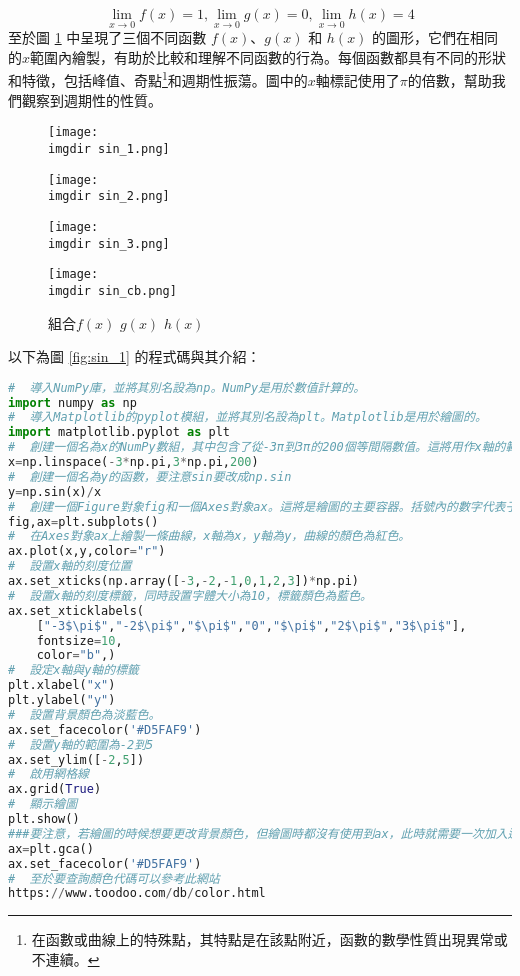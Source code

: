 $$\lim_{x \rightarrow 0}f(x)=1,\lim_{x \rightarrow 0}g(x)=0,\lim_{x \rightarrow 0}h(x)=4$$
至於圖 \ref{fig:sin_combine} 中呈現了三個不同函數 $f(x)$、$g(x)$ 和 $h(x)$ 的圖形，它們在相同的$x$範圍內繪製，有助於比較和理解不同函數的行為。每個函數都具有不同的形狀和特徵，包括峰值、奇點\footnote{在函數或曲線上的特殊點，其特點是在該點附近，函數的數學性質出現異常或不連續。}和週期性振蕩。圖中的$x$軸標記使用了$\pi$的倍數，幫助我們觀察到週期性的性質。
\begin{figure}[htbp]
\centering
\begin{minipage}{0.49\linewidth}
\centering
\texttt{[image: \\imgdir sin\_1.png]}
\caption{$f(x)=\frac{sin(x)}{x}$}
\label{fig:sin_1}
\end{minipage}
\begin{minipage}{0.49\linewidth}
\centering
\texttt{[image: \\imgdir sin\_2.png]}
\caption{$g(x)=\frac{sin(x^2)}{x}$}
\label{fig:sin_2}
\end{minipage}
\qquad
\begin{minipage}{0.49\linewidth}
\centering
\texttt{[image: \\imgdir sin\_3.png]}
\caption{$h(x)=\frac{sin^2(2x)}{x^2}$}
\label{fig:sin_3}
\end{minipage}
\begin{minipage}{0.49\linewidth}
\centering
\texttt{[image: \\imgdir sin\_cb.png]}
\caption{組合$f(x)$ $g(x)$ $h(x)$}
\label{fig:sin_combine}
\end{minipage}
\end{figure}
\newpage
以下為圖 \ref{fig:sin_1} 的程式碼與其介紹：
\begin{lstlisting}[language=Python]
#  導入NumPy庫，並將其別名設為np。NumPy是用於數值計算的。
import numpy as np
#  導入Matplotlib的pyplot模組，並將其別名設為plt。Matplotlib是用於繪圖的。
import matplotlib.pyplot as plt
#  創建一個名為x的NumPy數組，其中包含了從-3π到3π的200個等間隔數值。這將用作x軸的範圍。
x=np.linspace(-3*np.pi,3*np.pi,200)
#  創建一個名為y的函數，要注意sin要改成np.sin
y=np.sin(x)/x  
#  創建一個Figure對象fig和一個Axes對象ax。這將是繪圖的主要容器。括號內的數字代表子圖數量
fig,ax=plt.subplots()
#  在Axes對象ax上繪製一條曲線，x軸為x，y軸為y，曲線的顏色為紅色。
ax.plot(x,y,color="r")
#  設置x軸的刻度位置
ax.set_xticks(np.array([-3,-2,-1,0,1,2,3])*np.pi)
#  設置x軸的刻度標籤，同時設置字體大小為10，標籤顏色為藍色。
ax.set_xticklabels(
    ["-3$\pi$","-2$\pi$","$\pi$","0","$\pi$","2$\pi$","3$\pi$"],
    fontsize=10,
    color="b",)
#  設定x軸與y軸的標籤
plt.xlabel("x")
plt.ylabel("y")
#  設置背景顏色為淡藍色。
ax.set_facecolor('#D5FAF9')
#  設置y軸的範圍為-2到5
ax.set_ylim([-2,5])
#  啟用網格線
ax.grid(True)
#  顯示繪圖
plt.show()
###要注意，若繪圖的時候想要更改背景顏色，但繪圖時都沒有使用到ax，此時就需要一次加入這兩行。
ax=plt.gca()
ax.set_facecolor('#D5FAF9')
#  至於要查詢顏色代碼可以參考此網站
https://www.toodoo.com/db/color.html
	\end{lstlisting}
